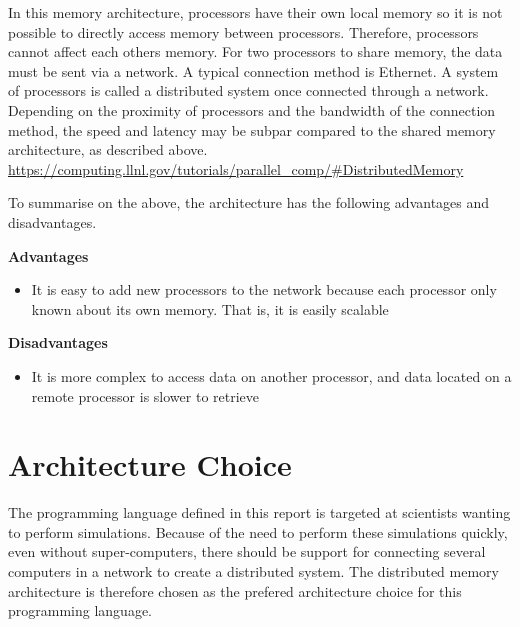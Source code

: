 In this memory architecture, processors have their own local memory so it is not possible to directly access memory between processors. Therefore, processors cannot affect each others memory. For two processors to share memory, the data must be sent via a network. A typical connection method is Ethernet. A system of processors is called a distributed system once connected through a network. Depending on the proximity of processors and the bandwidth of the connection method, the speed and latency may be subpar compared to the shared memory architecture, as described above. \url{https://computing.llnl.gov/tutorials/parallel_comp/#DistributedMemory}

To summarise on the above, the architecture has the following advantages and disadvantages.

\noindent\textbf{Advantages}
\begin{itemize}
    \item It is easy to add new processors to the network because each processor only known about its own memory. That is, it is easily scalable
\end{itemize}

\noindent\textbf{Disadvantages}
\begin{itemize}
    \item It is more complex to access data on another processor, and data located on a remote processor is slower to retrieve
\end{itemize}

\section{Architecture Choice}

The programming language defined in this report is targeted at scientists wanting to perform simulations. Because of the need to perform these simulations quickly, even without super-computers, there should be support for connecting several computers in a network to create a distributed system. The distributed memory architecture is therefore chosen as the prefered architecture choice for this programming language.
